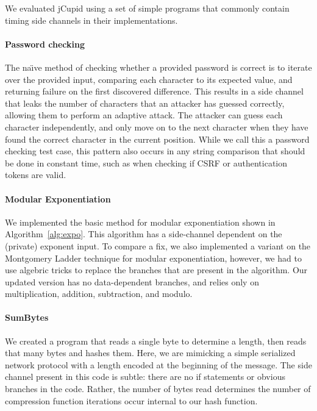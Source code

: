 

We evaluated jCupid using a set of simple programs that commonly contain timing
side channels in their implementations.


\paragraph{Password checking}
The na\"{\i}ve method of checking whether a provided password is correct is to iterate
over the provided input, comparing each character to its expected value, and
returning failure on the first discovered difference. This results in a side
channel that leaks the number of characters that an attacker has guessed
correctly, allowing them to perform an adaptive attack. The attacker can guess
each character independently, and only move on to the next character when they
have found the correct character in the current position. While we call this a
password checking test case, this pattern also occurs in any string comparison
that should be done in constant time, such as when checking if CSRF or
authentication tokens are valid.


\paragraph{Modular Exponentiation}
We implemented the basic method for modular exponentiation shown in
Algorithm~\ref{alg:expo}. This algorithm has a side-channel dependent on the
(private) exponent input. To compare a fix, we also implemented a variant on the Montgomery Ladder
technique for modular exponentiation, however, we had to use algebric tricks to
replace the branches that are present in the algorithm. Our updated version has no
data-dependent branches, and relies only on multiplication, addition,
subtraction, and modulo.


\paragraph{SumBytes}
We created a program that reads a single byte to determine a length, then reads
that many bytes and hashes them. Here, we are mimicking a simple serialized
network protocol with a length encoded at the beginning of the message. The side
channel present in this code is subtle: there are no if statements or obvious
branches in the code. Rather, the number of bytes read determines the number of
compression function iterations occur internal to our hash function.

